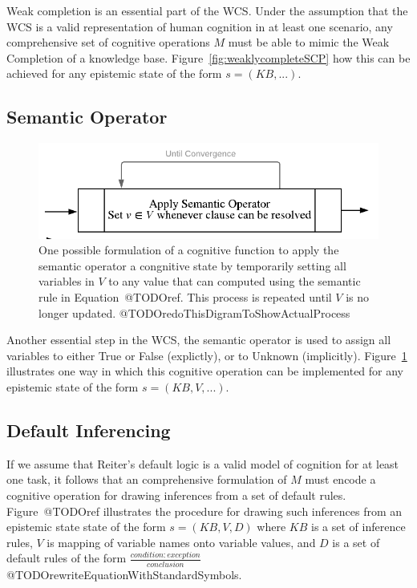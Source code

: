 \documentclass[
11pt, %
english, %
singlespacing, %
headsepline, %
]{MastersDoctoralThesis} %
\begin{document}
Weak completion is an essential part of the WCS. Under the assumption that the WCS is a valid representation of human cognition in at least one scenario, any comprehensive set of cognitive operations $M$ must be able to mimic the Weak Completion of a knowledge base. Figure~\ref{fig:weaklycompleteSCP} how this can be achieved for any epistemic state of the form $s=(KB,...)$.


\subsection{Semantic Operator}
\begin{figure} 
\begin{center}
\includegraphics[width=\linewidth]{semanticOperatorSCP}
\end{center}
\caption{One possible formulation of a cognitive function to apply the semantic operator a congnitive state by temporarily setting all variables in $V$ to any value that can computed using the semantic rule in Equation~@TODOref. This process is repeated until $V$ is no longer updated. @TODOredoThisDigramToShowActualProcess}
\label{fig:semanticOperatorSCP}
\end{figure}

Another essential step in the WCS, the semantic operator is used to assign all variables to either True or False (explictly), or to Unknown (implicitly). Figure~\ref{fig:semanticOperatorSCP} illustrates one way in which this cognitive operation can be implemented for any epistemic state of the form $s=(KB,V,...)$.



\subsection{Default Inferencing}
If we assume that Reiter's default logic is a valid model of cognition for at least one task, it follows that an comprehensive formulation of $M$ must encode a cognitive operation for drawing inferences from a set of default rules. Figure~@TODOref illustrates the procedure for drawing such inferences from an epistemic state state of the form $s=(KB,V,D)$ where $KB$ is a set of inference rules, $V$ is mapping of variable names onto variable values, and $D$ is a set of default rules of the form $\frac{condition:exception}{conclusion}$ @TODOrewriteEquationWithStandardSymbols.
\end{document}
